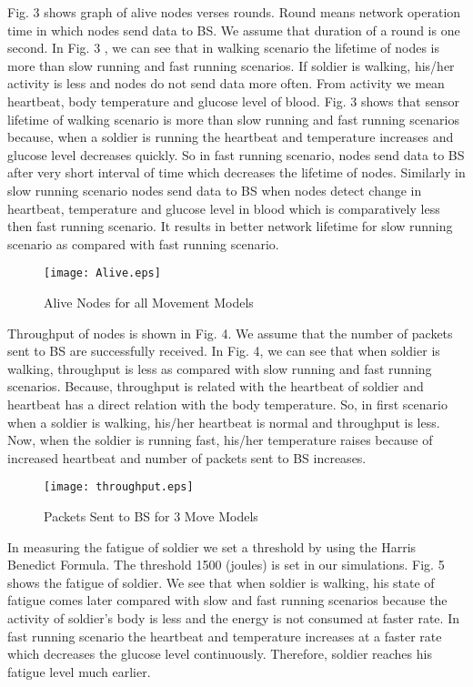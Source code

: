 \documentclass[journal]{IEEEtran}
\begin{document}
 Fig. 3 shows graph of alive nodes verses rounds. Round means network operation time in which nodes send data to BS. We assume that duration of a round is one second.
 In Fig. 3 , we can see that in walking scenario the lifetime of nodes is more than slow running and fast running scenarios. If soldier is walking, his/her activity
  is less and nodes do not send data more often. From activity we mean heartbeat, body temperature and glucose level of blood. Fig. 3 shows that sensor
  lifetime of walking scenario is more than slow running and fast running scenarios because, when a soldier is running the heartbeat and temperature increases and
   glucose level decreases quickly. So in fast running scenario, nodes send data to BS after very short interval of time which decreases the lifetime of
   nodes. Similarly in slow running scenario nodes send data to BS when nodes detect change in heartbeat, temperature and glucose level in blood which is
   comparatively less then fast running scenario. It results in better network lifetime for slow running scenario as compared with fast running scenario.
 \begin{figure} [!ht]
 \centering
 \texttt{[image: Alive.eps]}
 \vspace{-1cm}
 \caption{Alive Nodes for all Movement Models}
  \end{figure}

Throughput of nodes is shown in Fig. 4. We assume that the number of packets sent to BS are successfully received. In Fig. 4, we can see that when soldier is
walking, throughput is less as
 compared with slow running and fast running scenarios. Because, throughput is related with the heartbeat of soldier and heartbeat has a direct relation with
 the body temperature. So, in first scenario when a soldier is walking, his/her heartbeat is normal and throughput is less. Now, when the soldier is running fast,
 his/her temperature raises because of increased heartbeat and number of packets sent to BS increases.

 \begin{figure} [!ht]
 \centering
 \texttt{[image: throughput.eps]}
 \vspace{-1cm}
 \caption{Packets Sent to BS for 3 Move Models}
  \end{figure}

In measuring the fatigue of soldier we set a threshold by using the Harris Benedict Formula. The threshold 1500 (joules) is set in our simulations. Fig. 5
shows the fatigue of soldier. We see that when soldier is walking, his state of fatigue comes later compared with slow and fast running scenarios because the
 activity of soldier's body is less and the energy is not consumed at faster rate. In fast running scenario the heartbeat and temperature increases at a faster
 rate which decreases the glucose level continuously. Therefore, soldier reaches his fatigue level much earlier.
\end{document}
